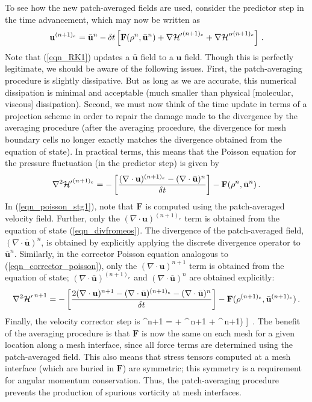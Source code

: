 \documentclass[11pt]{book}
\begin{document}
To see how the new patch-averaged fields are used, consider the predictor step in the time advancement, which may now be written as
\begin{equation}
\label{eqn_RK1}
\mathbf{u}^{(n+1)_e} = \bar{\mathbf{u}}^n - \delta t \left[ \mathbf{F}(\rho^n,\bar{\mathbf{u}}^n) + {\nabla{\cal H}'}^{(n+1)_e} + {\nabla{\cal H}''}^{(n+1)_e} \right] \,\mbox{.}
\end{equation}
Note that (\ref{eqn_RK1}) updates a $\bar{\mathbf{u}}$ field to a $\mathbf{u}$ field.  Though this is perfectly legitimate, we should be aware of the following issues.  First, the patch-averaging procedure is slightly dissipative.  But as long as we are accurate, this numerical dissipation is minimal and acceptable (much smaller than physical [molecular, viscous] dissipation).  Second, we must now think of the time update in terms of a projection scheme in order to repair the damage made to the divergence by the averaging procedure (after the averaging procedure, the divergence for mesh boundary cells no longer exactly matches the divergence obtained from the equation of state). In practical terms, this means that the Poisson equation for the pressure fluctuation (in the predictor step) is given by
\begin{equation}
\label{eqn_poisson_stg1}
\nabla^2 {{\cal H}'}^{(n+1)_e} = -\left[\frac{ (\nabla\cdot\mathbf{u})^{(n+1)_e} - (\nabla\cdot\bar{\mathbf{u}})^n}{\delta t}\right] -  \mathbf{F}(\rho^n,\bar{\mathbf{u}}^n) \,\mbox{.}
\end{equation}
In (\ref{eqn_poisson_stg1}), note that $\mathbf{F}$ is computed using the patch-averaged velocity field. Further, only the $(\nabla\cdot\mathbf{u})^{(n+1)_e}$ term is obtained from the equation of state (\ref{eqn_divfromeos}).  The divergence of the patch-averaged field, $(\nabla\cdot\bar{\mathbf{u}})^n$, is obtained by explicitly applying the discrete divergence operator to $\bar{\mathbf{u}}^n$.  Similarly, in the corrector Poisson equation analogous to (\ref{eqn_corrector_poisson}), only the $(\nabla\cdot\mathbf{u})^{n+1}$ term is obtained from the equation of state; $(\nabla\cdot\bar{\mathbf{u}})^{(n+1)_e}$ and $(\nabla\cdot\bar{\mathbf{u}})^n$ are obtained explicitly:
\begin{equation}
\label{eqn_poisson_stg2}
\nabla^2 {{\cal H}'}^{\,n+1} = -\left[\frac{ 2(\nabla\cdot\mathbf{u})^{n+1} - (\nabla\cdot\bar{\mathbf{u}})^{(n+1)_e} - (\nabla\cdot\bar{\mathbf{u}})^n}{\delta t}\right] -  \mathbf{F}(\rho^{(n+1)_e},\bar{\mathbf{u}}^{(n+1)_e}) \,\mbox{.}
\end{equation}
Finally, the velocity corrector step is
\be
\label{eqn_RK2}
\bu^{n+1} = \ha \left[ \bar{\bu}^n + \bar{\bu}^{(n+1)_e} - \dt \left( \mathbf{F}[\rho^{(n+1)_e},\bar{\mathbf{u}}^{(n+1)_e}] + ^{\,n+1} + ^{\,n+1}\right) \right] \,\mbox{.}
\ee
The benefit of the averaging procedure is that $\mathbf{F}$ is now the same on each mesh for a given location along a mesh interface, since all force terms are determined using the patch-averaged field.  This also means that stress tensors computed at a mesh interface (which are buried in $\mathbf{F}$) are symmetric; this symmetry is a requirement for angular momentum conservation.  Thus, the patch-averaging procedure prevents the production of spurious vorticity at mesh interfaces.
\end{document}
